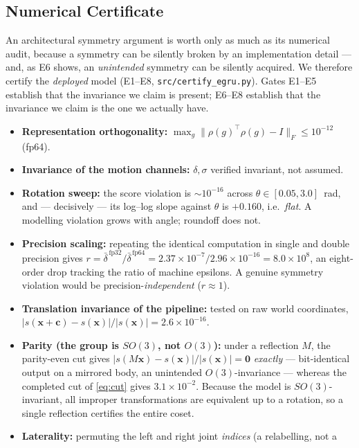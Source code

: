 \documentclass[10pt,journal]{IEEEtran}
\begin{document}
\subsection{Numerical Certificate}
\label{sec:method:cert}

An architectural symmetry argument is worth only as much as its numerical audit, because a symmetry
can be silently broken by an implementation detail --- and, as E6 shows, an \emph{unintended} symmetry
can be silently acquired. We therefore certify the \emph{deployed} model
(E1--E8, \texttt{src/certify\_egru.py}). Gates E1--E5 establish that the invariance we claim is
present; E6--E8 establish that the invariance we claim is the one we actually have.

\begin{itemize}
\item[E1] \textbf{Representation orthogonality:}
$\max_g\|\rho(g)^{\!\top}\rho(g)-I\|_F\le10^{-12}$ (fp64).
\item[E2] \textbf{Invariance of the motion channels:} $\delta,\sigma$ verified invariant, not assumed.
\item[E3] \textbf{Rotation sweep:} the score violation is $\sim\!10^{-16}$ across
$\theta\in[0.05,3.0]$~rad, and --- decisively --- its log--log slope against $\theta$ is $+0.160$,
i.e.\ \emph{flat}. A modelling violation grows with angle; roundoff does not.
\item[E4] \textbf{Precision scaling:} repeating the identical computation in single and double
precision gives
$r=\bar\delta^{\,\mathrm{fp32}}/\bar\delta^{\,\mathrm{fp64}}
=2.37\times10^{-7}/2.96\times10^{-16}=8.0\times10^{8}$,
an eight-order drop tracking the ratio of machine epsilons. A genuine symmetry violation would be
precision-\emph{independent} ($r\approx1$).
\item[E5] \textbf{Translation invariance of the pipeline:} tested on raw world coordinates,
$|s(\bm{x}+\bm{c})-s(\bm{x})|/|s(\bm{x})|=2.6\times10^{-16}$.
\item[E6] \textbf{Parity (the group is $SO(3)$, not $O(3)$):} under a reflection $M$, the
parity-even cut gives $|s(M\bm{x})-s(\bm{x})|/|s(\bm{x})|=\mathbf{0}$ \emph{exactly} --- bit-identical
output on a mirrored body, an unintended $O(3)$-invariance --- whereas the completed cut of
\eqref{eq:cut} gives $3.1\times10^{-2}$. Because the model is $SO(3)$-invariant, all improper
transformations are equivalent up to a rotation, so a single reflection certifies the entire coset.
\item[E7] \textbf{Laterality:} permuting the left and right joint \emph{indices} (a relabelling, not a

\end{itemize}
\end{document}
